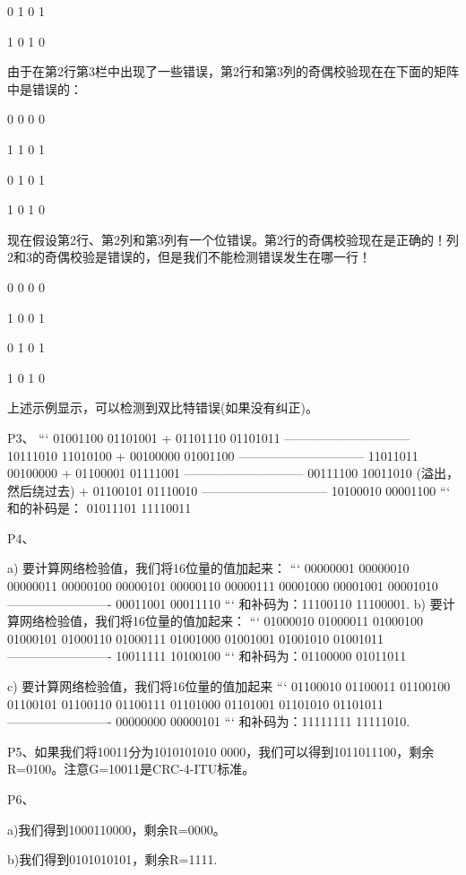 \documentclass[11pt,UTF8,twoside]{article}
\begin{document}
{		0 1 0 1 
		
		1 0 1 0 
		
		由于在第2行第3栏中出现了一些错误，第2行和第3列的奇偶校验现在在下面的矩阵中是错误的：
		
		0 0 0 0 
		
		1 1 0 1 
		
		0 1 0 1 
		
		1 0 1 0 
		
		现在假设第2行、第2列和第3列有一个位错误。第2行的奇偶校验现在是正确的！列2和3的奇偶校验是错误的，但是我们不能检测错误发生在哪一行！
		
		0 0 0 0
		
		1 0 0 1 
		
		0 1 0 1 
		
		1 0 1 0 
		
		上述示例显示，可以检测到双比特错误(如果没有纠正)。
		
		P3、
		```
		01001100 01101001 
		+ 01101110 01101011 
		------------------------------ 
		10111010 11010100 
		+ 00100000 01001100 
		------------------------------ 
		11011011 00100000 
		+ 01100001 01111001
		----------------------------- 
		00111100 10011010 (溢出，然后绕过去) 
		+ 01100101 01110010 
		------------------------------ 
		10100010 00001100 
		```
		和的补码是： 01011101 11110011 
		
		P4、
		
		a) 要计算网络检验值，我们将16位量的值加起来： 
		```
		00000001 00000010 
		00000011 00000100 
		00000101 00000110 
		00000111 00001000 
		00001001 00001010 
		------------------------- 
		00011001 00011110 
		```
		和补码为：11100110 11100001. 
		b) 要计算网络检验值，我们将16位量的值加起来： 
		```
		01000010 01000011 
		01000100 01000101 
		01000110 01000111 
		01001000 01001001 
		01001010 01001011 
		------------------------- 
		10011111 10100100 
		```
		和补码为：01100000 01011011 
		
		c) 要计算网络检验值，我们将16位量的值加起来
		```
		01100010 01100011 
		01100100 01100101 
		01100110 01100111 
		01101000 01101001 
		01101010 01101011 
		------------------------- 
		00000000 00000101 
		```
		和补码为：11111111 11111010.
		
		
		P5、如果我们将10011分为1010101010 0000，我们可以得到1011011100，剩余R=0100。注意G=10011是CRC-4-ITU标准。 
		
		P6、
		
		a)我们得到1000110000，剩余R=0000。
		
		b)我们得到0101010101，剩余R=1111. 
		
}
\end{document}
